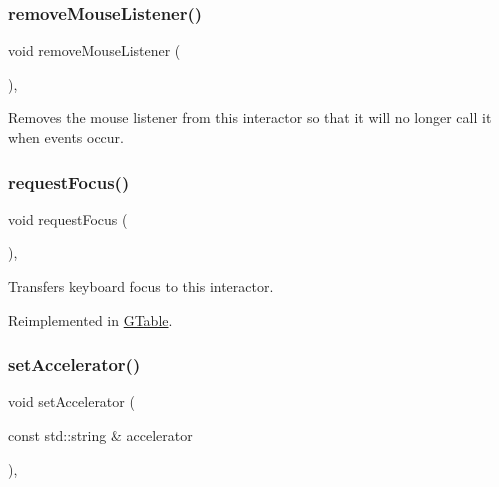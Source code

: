 \subsubsection{\texorpdfstring{remove\+Mouse\+Listener()}{removeMouseListener()}}
{\footnotesize\ttfamily void remove\+Mouse\+Listener (\begin{DoxyParamCaption}{ }\end{DoxyParamCaption})\hspace{0.3cm}{\ttfamily [virtual]}, {\ttfamily [inherited]}}



Removes the mouse listener from this interactor so that it will no longer call it when events occur. 

\mbox{\label{classsgl_1_1GInteractor_a519fb2ac767f8b2febbb50b898b8c8cb}} 
\subsubsection{\texorpdfstring{request\+Focus()}{requestFocus()}}
{\footnotesize\ttfamily void request\+Focus (\begin{DoxyParamCaption}{ }\end{DoxyParamCaption})\hspace{0.3cm}{\ttfamily [virtual]}, {\ttfamily [inherited]}}



Transfers keyboard focus to this interactor. 



Reimplemented in \mbox{\hyperlink{classsgl_1_1GTable_a5921efd0a5a83eacebdadb749fb3ea7a}{G\+Table}}.

\mbox{\label{classsgl_1_1GButton_a502f311e78e7531f8a7b50054ce91c85}} 
\subsubsection{\texorpdfstring{set\+Accelerator()}{setAccelerator()}}
{\footnotesize\ttfamily void set\+Accelerator (\begin{DoxyParamCaption}\item[{const std\+::string \&}]{accelerator }\end{DoxyParamCaption})\hspace{0.3cm}{\ttfamily [override]}, {\ttfamily [virtual]}}



